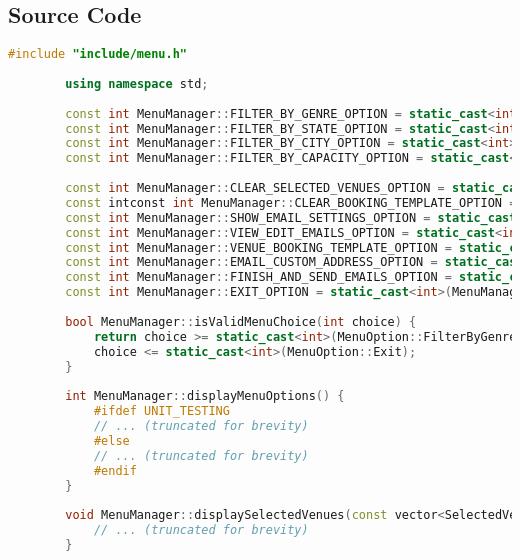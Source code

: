\documentclass{article}
\begin{document}
	\subsection*{Source Code}
	\begin{mdframed}[backgroundcolor=background, hidealllines=false, innerleftmargin=15pt, innerrightmargin=5pt, innertopmargin=0pt, innerbottommargin=-5pt, linecolor=accent]
	\begin{lstlisting}[language=C++]
		#include "include/menu.h"
		
		using namespace std;
		
		const int MenuManager::FILTER_BY_GENRE_OPTION = static_cast<int>(MenuManager::MenuOption::FilterByGenre);
		const int MenuManager::FILTER_BY_STATE_OPTION = static_cast<int>(MenuManager::MenuOption::FilterByState);
		const int MenuManager::FILTER_BY_CITY_OPTION = static_cast<int>(MenuManager::MenuOption::FilterByCity);
		const int MenuManager::FILTER_BY_CAPACITY_OPTION = static_cast<int>(MenuManager::MenuOption::FilterByCapacity);
		
		const int MenuManager::CLEAR_SELECTED_VENUES_OPTION = static_cast<int>(MenuManager::MenuOption::ClearSelectedVenues);
		const intconst int MenuManager::CLEAR_BOOKING_TEMPLATE_OPTION = static_cast<int>(MenuManager::MenuOption::ClearBookingTemplate); MenuManager::VIEW_SELECTED_VENUES_OPTION = static_cast<int>(MenuManager::MenuOption::ViewSelectedVenues);
		const int MenuManager::SHOW_EMAIL_SETTINGS_OPTION = static_cast<int>(MenuManager::MenuOption::ShowEmailSettings);
		const int MenuManager::VIEW_EDIT_EMAILS_OPTION = static_cast<int>(MenuManager::MenuOption::ViewEditEmail);
		const int MenuManager::VENUE_BOOKING_TEMPLATE_OPTION = static_cast<int>(MenuManager::MenuOption::VenueBookingTemplate);
		const int MenuManager::EMAIL_CUSTOM_ADDRESS_OPTION = static_cast<int>(MenuManager::MenuOption::EmailCustomAddress);
		const int MenuManager::FINISH_AND_SEND_EMAILS_OPTION = static_cast<int>(MenuManager::MenuOption::FinishAndSendEmail);
		const int MenuManager::EXIT_OPTION = static_cast<int>(MenuManager::MenuOption::Exit);
		
		bool MenuManager::isValidMenuChoice(int choice) {
			return choice >= static_cast<int>(MenuOption::FilterByGenre) &&
			choice <= static_cast<int>(MenuOption::Exit);
		}
		
		int MenuManager::displayMenuOptions() {
			#ifdef UNIT_TESTING
			// ... (truncated for brevity)
			#else
			// ... (truncated for brevity)
			#endif
		}
		
		void MenuManager::displaySelectedVenues(const vector<SelectedVenue>& selectedVenues) {
			// ... (truncated for brevity)
		}
	\end{lstlisting}
	\end{mdframed}
\end{document}
